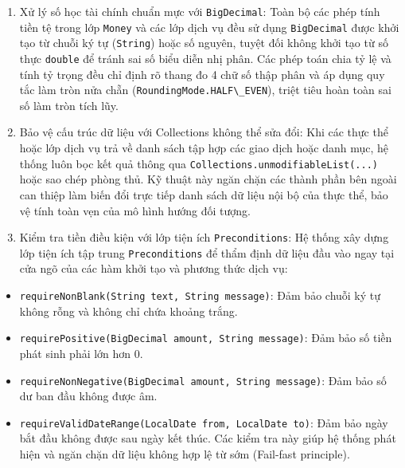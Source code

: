 \documentclass[a4paper,12pt]{report}
\providecommand{\tightlist}{%
  \setlength{\itemsep}{0pt}\setlength{\parskip}{0pt}}
\newcommand{\passthrough}[1]{#1}
\begin{document}
\begin{enumerate}
\def\labelenumi{\arabic{enumi}.}
\item
  Xử lý số học tài chính chuẩn mực với
  \passthrough{\lstinline!BigDecimal!}: Toàn bộ các phép tính tiền tệ
  trong lớp \passthrough{\lstinline!Money!} và các lớp dịch vụ đều sử
  dụng \passthrough{\lstinline!BigDecimal!} được khởi tạo từ chuỗi ký tự
  (\passthrough{\lstinline!String!}) hoặc số nguyên, tuyệt đối không
  khởi tạo từ số thực \passthrough{\lstinline!double!} để tránh sai số
  biểu diễn nhị phân. Các phép toán chia tỷ lệ và tính tỷ trọng đều chỉ
  định rõ thang đo 4 chữ số thập phân và áp dụng quy tắc làm tròn nửa
  chẵn (\passthrough{\lstinline!RoundingMode.HALF\_EVEN!}), triệt tiêu
  hoàn toàn sai số làm tròn tích lũy.
\item
  Bảo vệ cấu trúc dữ liệu với Collections không thể sửa đổi: Khi các
  thực thể hoặc lớp dịch vụ trả về danh sách tập hợp các giao dịch hoặc
  danh mục, hệ thống luôn bọc kết quả thông qua
  \passthrough{\lstinline!Collections.unmodifiableList(...)!} hoặc sao
  chép phòng thủ. Kỹ thuật này ngăn chặn các thành phần bên ngoài can
  thiệp làm biến đổi trực tiếp danh sách dữ liệu nội bộ của thực thể,
  bảo vệ tính toàn vẹn của mô hình hướng đối tượng.
\item
  Kiểm tra tiền điều kiện với lớp tiện ích
  \passthrough{\lstinline!Preconditions!}: Hệ thống xây dựng lớp tiện
  ích tập trung \passthrough{\lstinline!Preconditions!} để thẩm định dữ
  liệu đầu vào ngay tại cửa ngõ của các hàm khởi tạo và phương thức dịch
  vụ:
\end{enumerate}

\begin{itemize}
\tightlist
\item
  \passthrough{\lstinline!requireNonBlank(String text, String message)!}:
  Đảm bảo chuỗi ký tự không rỗng và không chỉ chứa khoảng trắng.
\item
  \passthrough{\lstinline!requirePositive(BigDecimal amount, String message)!}:
  Đảm bảo số tiền phát sinh phải lớn hơn 0.
\item
  \passthrough{\lstinline!requireNonNegative(BigDecimal amount, String message)!}:
  Đảm bảo số dư ban đầu không được âm.
\item
  \passthrough{\lstinline!requireValidDateRange(LocalDate from, LocalDate to)!}:
  Đảm bảo ngày bắt đầu không được sau ngày kết thúc. Các kiểm tra này
  giúp hệ thống phát hiện và ngăn chặn dữ liệu không hợp lệ từ sớm
  (Fail-fast principle).
\end{itemize}
\end{document}
